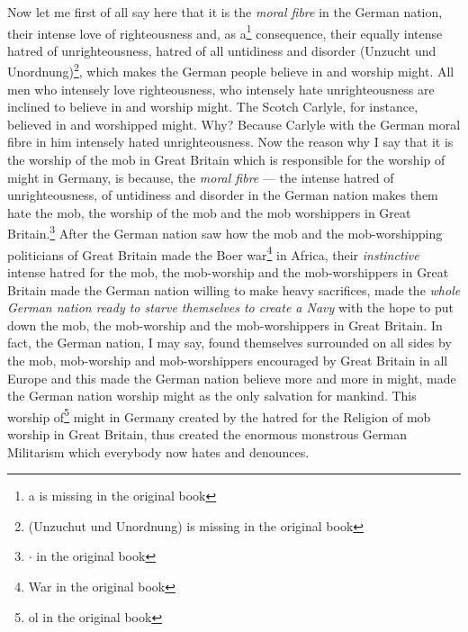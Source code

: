 Now let me first of all say here that it is the \emph{moral fibre} in the German nation, their intense love of righteousness and, as a\footnote{a is missing in the original book} consequence, their equally intense hatred of unrighteousness, hatred of all untidiness and disorder (Unzucht und Unordnung)\footnote{(Unzuchut und Unordnung) is missing in the original book}, which makes the German people believe in and worship might.
All men who intensely love righteousness, who intensely hate unrighteousness are inclined to believe in and worship might.
The Scotch Carlyle, for instance, believed in and worshipped might.
Why?
Because Carlyle with the German moral fibre in him intensely hated unrighteousness.
Now the reason why I say that it is the worship of the mob in Great Britain which is responsible for the worship of might in Germany, is because, the \emph{moral fibre} --- the intense hatred of unrighteousness, of untidiness and disorder in the German nation makes them hate the mob, the worship of the mob and the mob worshippers in Great Britain.\footnote{{\huge$\cdot$} in the original book} 
After the German nation saw how the mob and the mob-worshipping politicians of Great Britain made the Boer war\footnote{War in the original book} in Africa, their \emph{instinctive} intense hatred\cite{num3} for the mob, the mob-worship and the mob-worshippers in Great Britain made the German nation willing to make heavy sacrifices, made the \emph{whole German nation ready to starve themselves to create a Navy} with the hope to put down the mob, the mob-worship and the mob-worshippers in Great Britain.
In fact, the German nation, I may say, found themselves surrounded on all sides by the mob, mob-worship and mob-worshippers encouraged by Great Britain in all Europe and this made the German nation believe more and more in might, made the German nation worship might as the only salvation for mankind.
This worship of\footnote{ol in the original book} might in Germany created by the hatred for the Religion of mob worship in Great Britain, thus created the enormous monstrous German Militarism which everybody now hates and denounces.

